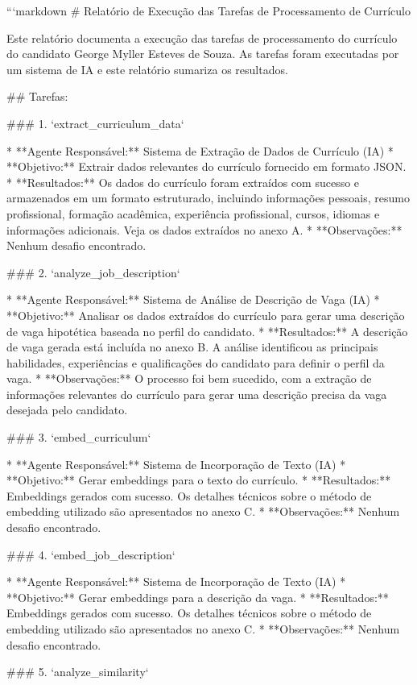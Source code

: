 ```markdown
# Relatório de Execução das Tarefas de Processamento de Currículo

Este relatório documenta a execução das tarefas de processamento do currículo do candidato George Myller Esteves de Souza.  As tarefas foram executadas por um sistema de IA e este relatório sumariza os resultados.

## Tarefas:

### 1. `extract_curriculum_data`

* **Agente Responsável:** Sistema de Extração de Dados de Currículo (IA)
* **Objetivo:** Extrair dados relevantes do currículo fornecido em formato JSON.
* **Resultados:** Os dados do currículo foram extraídos com sucesso e armazenados em um formato estruturado, incluindo informações pessoais, resumo profissional, formação acadêmica, experiência profissional, cursos, idiomas e informações adicionais.  Veja os dados extraídos no anexo A.
* **Observações:** Nenhum desafio encontrado.

### 2. `analyze_job_description`

* **Agente Responsável:** Sistema de Análise de Descrição de Vaga (IA)
* **Objetivo:** Analisar os dados extraídos do currículo para gerar uma descrição de vaga hipotética baseada no perfil do candidato.
* **Resultados:** A descrição de vaga gerada está incluída no anexo B.  A análise identificou as principais habilidades, experiências e qualificações do candidato para definir o perfil da vaga.
* **Observações:** O processo foi bem sucedido, com a extração de informações relevantes do currículo para gerar uma descrição precisa da vaga desejada pelo candidato.

### 3. `embed_curriculum`

* **Agente Responsável:** Sistema de Incorporação de Texto (IA)
* **Objetivo:** Gerar embeddings para o texto do currículo.
* **Resultados:** Embeddings gerados com sucesso.  Os detalhes técnicos sobre o método de embedding utilizado são apresentados no anexo C.
* **Observações:** Nenhum desafio encontrado.

### 4. `embed_job_description`

* **Agente Responsável:** Sistema de Incorporação de Texto (IA)
* **Objetivo:** Gerar embeddings para a descrição da vaga.
* **Resultados:** Embeddings gerados com sucesso.  Os detalhes técnicos sobre o método de embedding utilizado são apresentados no anexo C.
* **Observações:** Nenhum desafio encontrado.

### 5. `analyze_similarity`

